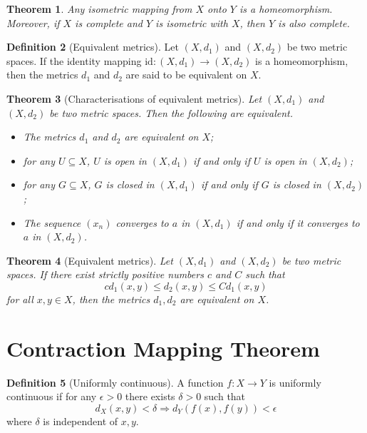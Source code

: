 \documentclass[10pt, oneside, reqno]{amsart}
\theoremstyle{plain}%
\newtheorem{thm}{Theorem}[section]
\theoremstyle{definition}
\newtheorem{defn}[thm]{Definition}
\theoremstyle{remark}
\begin{document}
\begin{thm}
    Any isometric mapping from $X$ onto $Y$ is a homeomorphism.  Moreover, if $X$ is complete and $Y$ is isometric with $X$, then $Y$ is also complete.
    \end{thm}
    
\begin{defn}[Equivalent metrics]
    Let $(X, d_1)$ and $(X, d_2)$ be two metric spaces.  If the identity mapping $\text{id} : (X, d_1) \rightarrow (X, d_2)$ is a homeomorphism, then the metrics $d_1$ and $d_2$ are said to be equivalent on $X$.
\end{defn}

\begin{thm}[Characterisations of equivalent metrics]
    Let $(X, d_1)$ and $(X, d_2)$ be two metric spaces.  Then the following are equivalent.
    \begin{itemize}
        \item The metrics $d_1$ and $d_2$ are equivalent on $X$;
        \item for any $U \subseteq X$, $U$ is open in $(X, d_1)$ if and only if $U$ is open in $(X, d_2)$;
        \item for any $G \subseteq X$, $G$ is closed in $(X, d_1)$ if and only if $G$ is closed in $(X, d_2)$;
        \item The sequence $(x_n)$ converges to $a$ in $(X, d_1)$ if and only if it converges to $a$ in $(X, d_2)$.
    \end{itemize}
\end{thm}

\begin{thm}[Equivalent metrics]
    Let $(X, d_1)$ and $(X, d_2)$ be two metric spaces.  If there exist strictly positive numbers $c$ and $C$ such that \[
        c d_1(x,y) \leq d_2(x,y) \leq C d_1(x,y)
    \] for all $x,y \in X$, then the metrics $d_1, d_2$ are equivalent on $X$.
    \end{thm}

\section{Contraction Mapping Theorem} %
\label{sec:contraction_mapping_theorem}

\begin{defn}[Uniformly continuous]
    A function $f: X \rightarrow Y$ is uniformly continuous if for any $\epsilon > 0$ there exists $\delta > 0$ such that \[
        d_X(x,y) < \delta \Rightarrow d_Y(f(x), f(y)) < \epsilon
    \] where $\delta$ is independent of $x,y$.
\end{defn}
\end{document}
